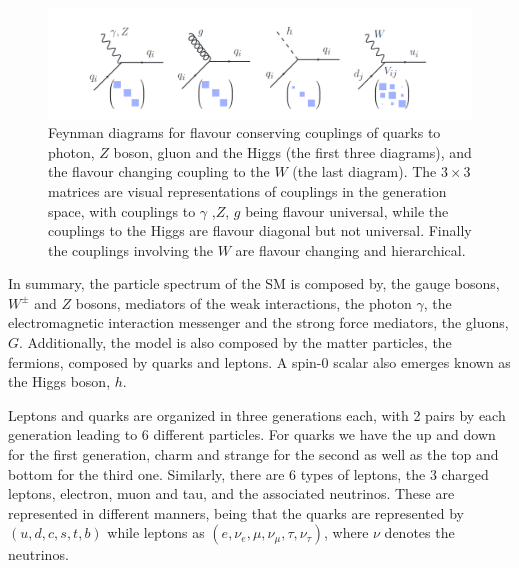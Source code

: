 \documentclass[10pt]{report}
\begin{document}
%
\begin{figure}[!htb]
	\centering
	\includegraphics[width=1\textwidth]{TestYukawaCouplings.pdf}
	\caption{Feynman diagrams for flavour conserving couplings of quarks to photon, $Z$ boson, gluon and the Higgs (the first three diagrams), and the flavour changing coupling to the $W$ (the last diagram). The $3\times3$ matrices are visual representations of couplings in the generation space, with couplings to $\gamma$ ,$Z$, $g$ being flavour universal, while the couplings to the Higgs are flavour diagonal but not universal. Finally the couplings involving the $W$ are flavour changing and hierarchical.}
	\label{fig:QuarkCKM}
\end{figure}

In summary, the particle spectrum of the SM is composed by, the gauge bosons, $W^\pm$ and $Z$ bosons, mediators of the weak interactions, the photon $\gamma$, the electromagnetic interaction messenger and the strong force mediators, the gluons, $G$. Additionally, the model is also composed  by the matter particles, the fermions, composed by quarks and leptons. A spin-0 scalar also emerges known as the Higgs boson, $h$. 

Leptons and quarks are organized in three generations each, with 2 pairs by each generation leading to 6 different particles. For quarks we have the up and down for the first generation, charm and strange for the second as well as the top and bottom for the third one. Similarly, there are 6 types of leptons, the 3 charged leptons, electron, muon and tau, and the associated neutrinos. These are represented in different manners, being that the quarks are represented by $(u,d,c,s,t,b)$ while leptons as $(e,\nu_{e},\mu,\nu_{\mu},\tau,\nu_{\tau})$, where $\nu$ denotes the neutrinos. 
\end{document}
